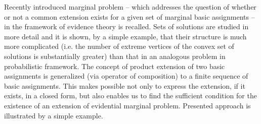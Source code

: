 
Recently introduced marginal problem -- which addresses the question
of whether or not a common extension exists for a given set of
marginal basic assignments -- in the framework of evidence theory is
recalled. Sets of solutions are studied in more detail and it is
shown, by a simple example, that their structure is much more
complicated (i.e. the number of extreme vertices of the convex set
of solutions is substantially greater) than that in an analogous
problem in probabilistic framework. The concept of product extension
of two basic assignments is generalized (via operator of
composition) to a finite sequence of basic assignments. This makes
possible not only to express the extension, if it exists, in a
closed form, but also enables us to find the sufficient condition
for the existence of an extension of evidential marginal problem.
Presented approach is illustrated by a simple example.


